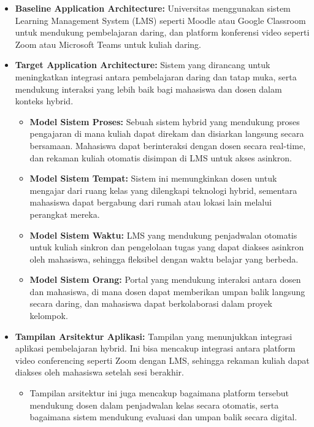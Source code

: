 \begin{itemize}
	\item \textbf{Baseline Application Architecture:} Universitas menggunakan sistem Learning Management System (LMS) seperti Moodle atau Google Classroom untuk mendukung pembelajaran daring, dan platform konferensi video seperti Zoom atau Microsoft Teams untuk kuliah daring. 
	
	\item \textbf{Target Application Architecture:} Sistem yang dirancang untuk meningkatkan integrasi antara pembelajaran daring dan tatap muka, serta mendukung interaksi yang lebih baik bagi mahasiswa dan dosen dalam konteks hybrid. 
	
	\begin{itemize}
		\item \textbf{Model Sistem Proses:} Sebuah sistem hybrid yang mendukung proses pengajaran di mana kuliah dapat direkam dan disiarkan langsung secara bersamaan. Mahasiswa dapat berinteraksi dengan dosen secara real-time, dan rekaman kuliah otomatis disimpan di LMS untuk akses asinkron.
		\item \textbf{Model Sistem Tempat:} Sistem ini memungkinkan dosen untuk mengajar dari ruang kelas yang dilengkapi teknologi hybrid, sementara mahasiswa dapat bergabung dari rumah atau lokasi lain melalui perangkat mereka.
		\item \textbf{Model Sistem Waktu:} LMS yang mendukung penjadwalan otomatis untuk kuliah sinkron dan pengelolaan tugas yang dapat diakses asinkron oleh mahasiswa, sehingga fleksibel dengan waktu belajar yang berbeda.
		\item \textbf{Model Sistem Orang:} Portal yang mendukung interaksi antara dosen dan mahasiswa, di mana dosen dapat memberikan umpan balik langsung secara daring, dan mahasiswa dapat berkolaborasi dalam proyek kelompok.
	\end{itemize}
	
	\item \textbf{Tampilan Arsitektur Aplikasi:} Tampilan yang menunjukkan integrasi aplikasi pembelajaran hybrid. Ini bisa mencakup integrasi antara platform video conferencing seperti Zoom dengan LMS, sehingga rekaman kuliah dapat diakses oleh mahasiswa setelah sesi berakhir.
	
	\begin{itemize}
		\item Tampilan arsitektur ini juga mencakup bagaimana platform tersebut mendukung dosen dalam penjadwalan kelas secara otomatis, serta bagaimana sistem mendukung evaluasi dan umpan balik secara digital.
	\end{itemize}
\end{itemize}

